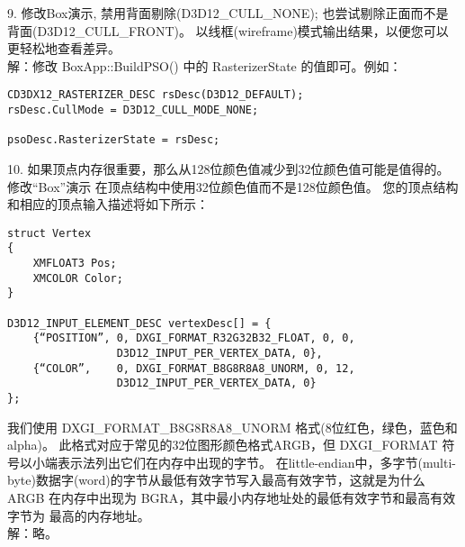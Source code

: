 \begin{flushleft}
9. 修改Box演示, 禁用背面剔除(D3D12\_CULL\_NONE); 也尝试剔除正面而不是背面(D3D12\_CULL\_FRONT)。 以线框(wireframe)模式输出结果，以便您可以更轻松地查看差异。\\
解：修改 BoxApp::BuildPSO() 中的 RasterizerState 的值即可。例如：
\end{flushleft}
\begin{lstlisting}
CD3DX12_RASTERIZER_DESC rsDesc(D3D12_DEFAULT);
rsDesc.CullMode = D3D12_CULL_MODE_NONE;

psoDesc.RasterizerState = rsDesc;
\end{lstlisting}

\begin{flushleft}
10. 如果顶点内存很重要，那么从128位颜色值减少到32位颜色值可能是值得的。修改“Box”演示 在顶点结构中使用32位颜色值而不是128位颜色值。 您的顶点结构和相应的顶点输入描述将如下所示：\\
\end{flushleft}
\begin{lstlisting}
struct Vertex
{
    XMFLOAT3 Pos;
    XMCOLOR Color;
}

D3D12_INPUT_ELEMENT_DESC vertexDesc[] = {
    {“POSITION”, 0, DXGI_FORMAT_R32G32B32_FLOAT, 0, 0, 
                 D3D12_INPUT_PER_VERTEX_DATA, 0},
    {“COLOR”,    0, DXGI_FORMAT_B8G8R8A8_UNORM, 0, 12,
                 D3D12_INPUT_PER_VERTEX_DATA, 0}
};
\end{lstlisting}
\begin{flushleft}
我们使用 DXGI\_FORMAT\_B8G8R8A8\_UNORM 格式(8位红色，绿色，蓝色和alpha)。 此格式对应于常见的32位图形颜色格式ARGB，但 DXGI\_FORMAT 符号以小端表示法列出它们在内存中出现的字节。 在little-endian中，多字节(multi-byte)数据字(word)的字节从最低有效字节写入最高有效字节，这就是为什么 ARGB 在内存中出现为 BGRA，其中最小内存地址处的最低有效字节和最高有效字节为 最高的内存地址。\\
解：略。
\end{flushleft}

